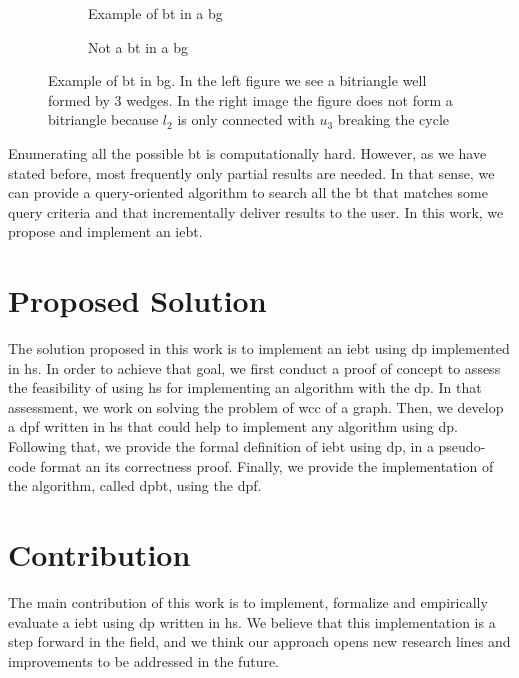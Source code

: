 \begin{figure}[htp!]
\begin{subfigure}[b]{0.5\textwidth}
\centering
{}
\caption{Example of \acrshort{bt} in a \acrshort{bg}}
\label{fig:bitriangle-example}
\end{subfigure}
\begin{subfigure}[b]{0.5\textwidth}
\centering
{}
\caption{Not a \acrshort{bt} in a \acrshort{bg}}
\label{fig:bitriangle-not}
\end{subfigure}
\caption[{[Int] Example of \acrshort{bt} in a \acrshort{bg}}]{Example of \acrshort{bt} in \acrshort{bg}. In the left figure  we see a bitriangle well formed by 3 wedges. In the right image the figure does not form a bitriangle because $l_2$ is only connected with $u_3$ breaking the cycle}
\end{figure}

Enumerating all the possible \acrshort{bt} is computationally hard. However, as we have stated before, most frequently only partial results are needed. In that sense, we can provide a query-oriented  algorithm to search all  the \acrshort{bt} that matches some query criteria and  that incrementally deliver results to the user. In this work, we propose and implement an \acrlong{iebt}.

\section{Proposed Solution}
The solution proposed in this work is to implement an \acrlong{iebt} using \acrlong{dp} implemented in \acrfull{hs}.
In order to achieve that goal, we first conduct a proof of concept to assess the feasibility of using \acrshort{hs} for implementing an algorithm with the \acrshort{dp}. In that assessment, we work on solving the problem of \acrfull{wcc} of a graph. Then, we develop a \acrfull{dpf} written in \acrlong{hs} that could help to implement any algorithm using \acrshort{dp}.
Following that, we provide the formal definition of \acrshort{iebt} using \acrshort{dp}, in a pseudo-code format an its correctness proof.   Finally, we provide the implementation of the algorithm, called \acrfull{dpbt}, using the \acrshort{dpf}. 

\section{Contribution}\label{sec:contrib}
The main contribution of this work is to implement, formalize and empirically evaluate a \acrlong{iebt} using \acrlong{dp} written in \acrshort{hs}.
We believe that this implementation is a step forward in the field, and we think our approach opens new research lines and improvements to be addressed in the future. 

